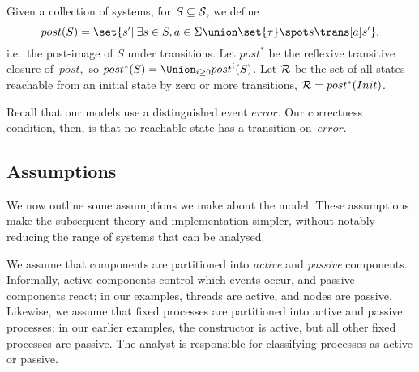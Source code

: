 Given a collection of systems, for $S \subseteq \S$, we define 
\[
post(S) = \set{ s' \| 
  \exists s \in S, a \in \Sigma \union \set{\tau} \spot s \trans[a] s'},
\]
i.e.~the post-image of $S$ under transitions.  Let $post^*$ be the reflexive
transitive closure of~$post$,\, so $post^*(S) = \Union_{i \ge 0}
post^i(S)$.  Let $\R$ be the set of all states reachable from an initial
state by zero or more transitions, $\R = post^*(Init)$.

Recall that our models use a distinguished event $error$.  Our correctness
condition, then, is that no reachable state has a transition on~$error$.



\subsection{Assumptions}

We now outline some assumptions we make about the model.  These assumptions
make the subsequent theory and implementation simpler, without notably
reducing the range of systems that can be analysed.  

We assume that components are partitioned into \emph{active} and
\emph{passive} components.  Informally, active components control which events
occur, and passive components react; in our examples, threads are active, and
nodes are passive.  Likewise, we assume that fixed processes are partitioned
into active and passive processes; in our earlier examples, the constructor is
active, but all other fixed processes are passive.  The analyst is responsible
for classifying processes as active or passive. 


